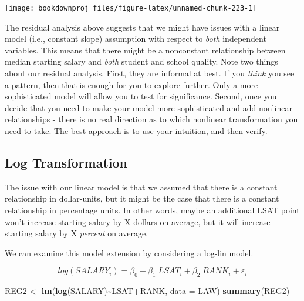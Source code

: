 \documentclass[
]{book}
\newenvironment{Shaded}{\begin{snugshade}}{\end{snugshade}}
\newcommand{\AttributeTok}[1]{\textcolor[rgb]{0.13,0.29,0.53}{#1}}
\newcommand{\FunctionTok}[1]{\textcolor[rgb]{0.13,0.29,0.53}{\textbf{#1}}}
\newcommand{\NormalTok}[1]{#1}
\newcommand{\OtherTok}[1]{\textcolor[rgb]{0.56,0.35,0.01}{#1}}
\newcommand{\SpecialCharTok}[1]{\textcolor[rgb]{0.81,0.36,0.00}{\textbf{#1}}}
\begin{document}
\begin{center}\texttt{[image: bookdownproj\_files/figure-latex/unnamed-chunk-223-1]} \end{center}

The residual analysis above suggests that we might have issues with a linear model (i.e., constant slope) assumption with respect to \emph{both} independent variables. This means that there might be a nonconstant relationship between median starting salary and \emph{both} student and school quality. Note two things about our residual analysis. First, they are informal at best. If you \emph{think} you see a pattern, then that is enough for you to explore further. Only a more sophisticated model will allow you to test for significance. Second, once you decide that you need to make your model more sophisticated and add nonlinear relationships - there is no real direction as to which nonlinear transformation you need to take. The best approach is to use your intuition, and then verify.

\subsection*{Log Transformation}\label{log-transformation}

The issue with our linear model is that we assumed that there is a constant relationship in dollar-units, but it might be the case that there is a constant relationship in percentage units. In other words, maybe an additional LSAT point won't increase starting salary by X dollars on average, but it will increase starting salary by X \emph{percent} on average.

We can examine this model extension by considering a log-lin model.

\[log(SALARY_i) = \beta_0 + \beta_1 \; LSAT_i + \beta_2 \; RANK_i + \varepsilon_i\]

\begin{Shaded}
\begin{Highlighting}[]
\NormalTok{REG2 }\OtherTok{\textless{}{-}} \FunctionTok{lm}\NormalTok{(}\FunctionTok{log}\NormalTok{(SALARY)}\SpecialCharTok{\textasciitilde{}}\NormalTok{LSAT}\SpecialCharTok{+}\NormalTok{RANK, }\AttributeTok{data =}\NormalTok{ LAW)}
\FunctionTok{summary}\NormalTok{(REG2)}
\end{Highlighting}
\end{Shaded}
\end{document}
